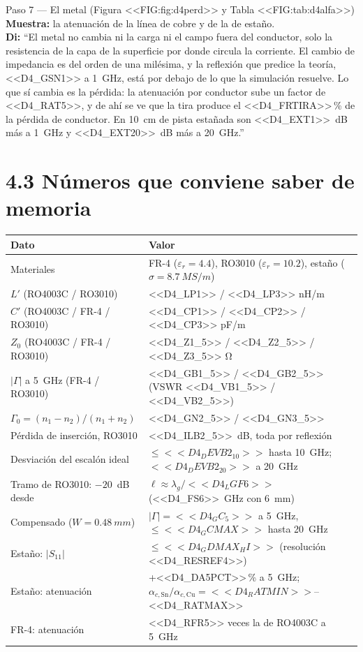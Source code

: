 \documentclass[11pt,letterpaper]{article}
\begin{document}
\begin{paso}{Paso 7 --- El metal (Figura <<FIG:fig:d4perd>> y Tabla <<FIG:tab:d4alfa>>)}
\textbf{Muestra:} la atenuación de la línea de cobre y de la de estaño.\\
\textbf{Di:} ``El metal no cambia ni la carga ni el campo fuera del conductor, solo la resistencia de la capa de la superficie por donde circula la corriente. El cambio de impedancia es del orden de una milésima, y la reflexión que predice la teoría, <<D4_GSN1>> a \SI{1}{GHz}, está por debajo de lo que la simulación resuelve. Lo que sí cambia es la pérdida: la atenuación por conductor sube un factor de <<D4_RAT5>>, y de ahí se ve que la tira produce el <<D4_FRTIRA>>\,\% de la pérdida de conductor. En \SI{10}{cm} de pista estañada son \SI{<<D4_EXT1>>}{dB} más a \SI{1}{GHz} y \SI{<<D4_EXT20>>}{dB} más a \SI{20}{GHz}.''
\end{paso}

\section*{4.3 Números que conviene saber de memoria}
\begin{center}
\small
\begin{tabular}{ll}
\toprule
Dato & Valor \\
\midrule
Materiales & FR-4 ($\varepsilon_r=4.4$), RO3010 ($\varepsilon_r=10.2$), estaño ($\sigma=\SI{8.7}{MS/m}$) \\
$L'$ (RO4003C / RO3010) & <<D4_LP1>> / <<D4_LP3>> nH/m \\
$C'$ (RO4003C / FR-4 / RO3010) & <<D4_CP1>> / <<D4_CP2>> / <<D4_CP3>> pF/m \\
$Z_0$ (RO4003C / FR-4 / RO3010) & <<D4_Z1_5>> / <<D4_Z2_5>> / <<D4_Z3_5>> \si{\ohm} \\
$|\Gamma|$ a \SI{5}{GHz} (FR-4 / RO3010) & <<D4_GB1_5>> / <<D4_GB2_5>> (VSWR <<D4_VB1_5>> / <<D4_VB2_5>>) \\
$\Gamma_0=(n_1-n_2)/(n_1+n_2)$ & <<D4_GN2_5>> / <<D4_GN3_5>> \\
Pérdida de inserción, RO3010 & \SI{<<D4_ILB2_5>>}{dB}, toda por reflexión \\
Desviación del escalón ideal & $\leq <<D4_DEVB2_10>>$ hasta \SI{10}{GHz}; $<<D4_DEVB2_20>>$ a \SI{20}{GHz} \\
Tramo de RO3010: $-20$~dB desde & $\ell\approx\lambda_g/<<D4_LGF6>>$ (\SI{<<D4_FS6>>}{GHz} con \SI{6}{mm}) \\
Compensado ($W=\SI{0.48}{mm}$) & $|\Gamma|=<<D4_GC_5>>$ a \SI{5}{GHz}, $\leq <<D4_GCMAX>>$ hasta \SI{20}{GHz} \\
Estaño: $|S_{11}|$ & $\leq <<D4_GDMAX_HI>>$ (resolución <<D4_RESREF4>>) \\
Estaño: atenuación & +<<D4_DA5PCT>>\,\% a \SI{5}{GHz}; $\alpha_{c,\mathrm{Sn}}/\alpha_{c,\mathrm{Cu}}=<<D4_RATMIN>>$--<<D4_RATMAX>> \\
FR-4: atenuación & <<D4_RFR5>> veces la de RO4003C a \SI{5}{GHz} \\
\bottomrule
\end{tabular}
\end{center}
\end{document}
